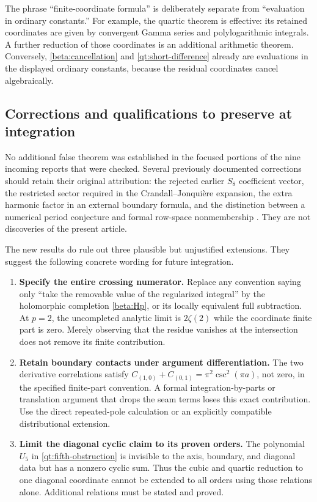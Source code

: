 \documentclass[11pt]{article}
\numberwithin{equation}{section}
\theoremstyle{definition}
\theoremstyle{remark}
\begin{document}
The phrase ``finite-coordinate formula'' is deliberately separate from
``evaluation in ordinary constants.'' For example, the quartic theorem
is effective: its retained coordinates are given by convergent Gamma
series and polylogarithmic integrals. A further reduction of those
coordinates is an additional arithmetic theorem. Conversely,
\eqref{beta:cancellation} and \eqref{qt:short-difference} already are
evaluations in the displayed ordinary constants, because the residual
coordinates cancel algebraically.

\subsection{Corrections and qualifications to preserve at integration}

No additional false theorem was established in the focused portions of
the nine incoming reports that were checked. Several previously
documented corrections should retain their original attribution: the
rejected earlier $S_8$ coefficient vector, the restricted sector required
in the Crandall--Jonqui\`ere expansion, the extra harmonic factor in an
external boundary formula, and the distinction between a numerical
period conjecture and formal row-space nonmembership
\cite{RepoExact,RepoCubic,RepoIndependent}. They are not discoveries of
the present article.

The new results do rule out three plausible but unjustified extensions.
They suggest the following concrete wording for future integration.
\begin{enumerate}
\item \textbf{Specify the entire crossing numerator.}
Replace any convention saying only ``take the removable value of the
regularized integral'' by the holomorphic completion
\eqref{beta:Hp}, or its locally equivalent full subtraction. At $p=2$,
the uncompleted analytic limit is $2\zeta(2)$ while the coordinate
finite part is zero. Merely observing that the residue vanishes at the
intersection does not remove its finite contribution.
\item \textbf{Retain boundary contacts under argument differentiation.}
The two derivative correlations satisfy
$C_{(1,0)}+C_{(0,1)}=\pi^2\csc^2(\pi a)$, not zero, in the specified
finite-part convention. A formal integration-by-parts or translation
argument that drops the seam terms loses this exact contribution.
Use the direct repeated-pole calculation or an explicitly compatible
distributional extension.
\item \textbf{Limit the diagonal cyclic claim to its proven orders.}
The polynomial $U_5$ in \eqref{qt:fifth-obstruction} is invisible to the
axis, boundary, and diagonal data but has a nonzero cyclic sum. Thus the
cubic and quartic reduction to one diagonal coordinate cannot be
extended to all orders using those relations alone. Additional
relations must be stated and proved.
\end{enumerate}
\end{document}

